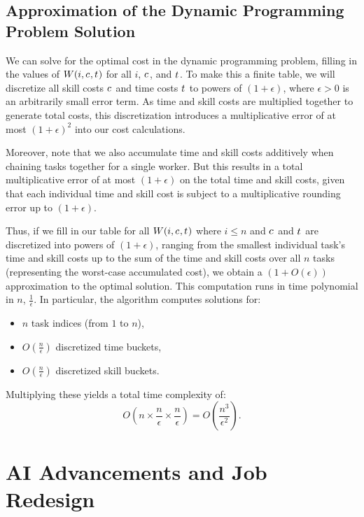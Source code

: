 \documentclass{article}
\theoremstyle{plain}
\theoremstyle{plain}
\begin{document}
\subsection{Approximation of the Dynamic Programming Problem Solution}
We can solve for the optimal cost in the dynamic programming problem, filling in the values of $W(i, c_{}, t_{})$ for all $i$, $c_{}$, and $t_{}$.  
To make this a finite table, we will discretize all skill costs $c_{}$ and time costs $t_{}$ to powers of $(1+\epsilon)$, where $\epsilon > 0$ is an arbitrarily small error term.
As time and skill costs are multiplied together to generate total costs, this discretization introduces a multiplicative error of at most $(1+\epsilon)^2$ into our cost calculations.

Moreover, note that we also accumulate time and skill costs additively when chaining tasks together for a single worker.  
But this results in a total multiplicative error of at most $(1+\epsilon)$ on the total time and skill costs, given that each individual time and skill cost is subject to a multiplicative rounding error up to $(1+\epsilon)$.

Thus, if we fill in our table for all $W(i, c_{}, t_{})$ where $i \leq n$ and $c_{}$ and $t_{}$ are discretized into powers of $(1+\epsilon)$, ranging from the smallest individual task's time and skill costs up to the sum of the time and skill costs over all $n$ tasks (representing the worst-case accumulated cost), we obtain a $(1 + O(\epsilon))$ approximation to the optimal solution.
This computation runs in time polynomial in $n$, $\frac{1}{\epsilon}$. %
In particular, the algorithm computes solutions for:
\begin{itemize}
\item $n$ task indices (from $1$ to $n$),
\item $O(\frac{n}{\epsilon})$ discretized time buckets,
\item $O(\frac{n}{\epsilon})$ discretized skill buckets.
\end{itemize}
Multiplying these yields a total time complexity of:
\[
O\left(n \times \frac{n}{\epsilon} \times \frac{n}{\epsilon}\right) = O\left(\frac{n^3}{\epsilon^2}\right).
\]





\section{AI Advancements and Job Redesign}
\label{sec:job_redesign}
\end{document}
